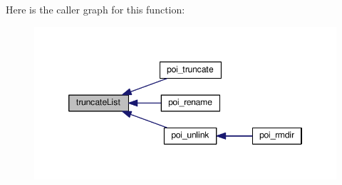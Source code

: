 Here is the caller graph for this function\-:
\nopagebreak
\begin{figure}[H]
\begin{center}
\leavevmode
\includegraphics[width=346pt]{allocation-table_8h_a986965542b07562f2f205f9d68043a9c_icgraph}
\end{center}
\end{figure}


